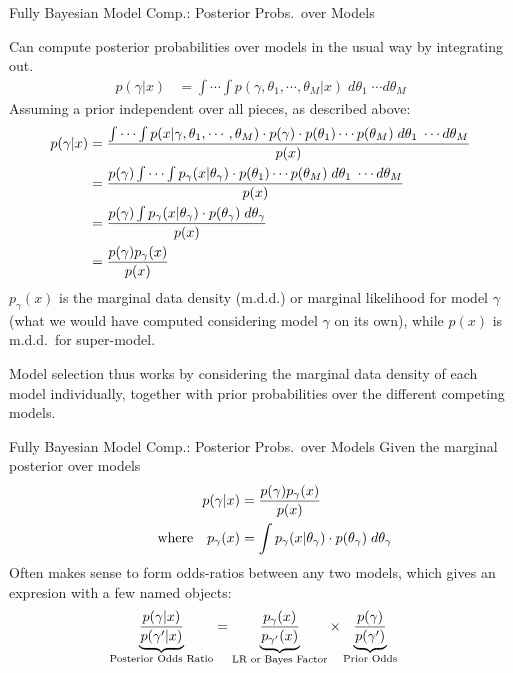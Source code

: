 \documentclass[aspectratio=169, handout]{beamer}
\begin{document}
{\scriptsize
\begin{frame}{Fully Bayesian Model Comp.: Posterior Probs.\ over Models}

Can compute posterior probabilities over models in the usual way by
integrating out.
\begin{align*}
  p(\gamma|x)
  &=
  \int
  \cdots
  \int
  p(\gamma,\theta_1,\cdots,\theta_M|x)
  \;d\theta_1\;\cdots d\theta_M
\end{align*}
Assuming a prior independent over all pieces, as described above:
\begin{align*}
  p(\gamma|x)
  &=
  \frac{%
    \int
    \cdots
    \int
    p(x|\gamma,\theta_1,\cdots,\theta_M)
    \cdot
    p(\gamma)
    \cdot
    p(\theta_1)
    \cdots
    p(\theta_M)
    \;d\theta_1\;\cdots d\theta_M
  }{%
    p(x)
  }
  \\
  &=
  \frac{%
    p(\gamma)
    \int
    \cdots
    \int
    p_\gamma(x|\theta_\gamma)
    \cdot
    p(\theta_1)
    \cdots
    p(\theta_M)
    \;d\theta_1\;\cdots d\theta_M
  }{%
    p(x)
  }
  \\
  &=
  \frac{%
    p(\gamma)
    \int
    p_\gamma(x|\theta_\gamma)
    \cdot
    p(\theta_\gamma)
    \;d\theta_\gamma
  }{%
    p(x)
  }
  \\
  &=
  \frac{%
    p(\gamma)
    p_\gamma(x)
  }{%
    p(x)
  }
\end{align*}
$p_\gamma(x)$ is the \alert{marginal data density} (m.d.d.) or
\alert{marginal likelihood} for model $\gamma$ (what we would have
computed considering model $\gamma$ on its own), while $p(x)$ is m.d.d.\
for super-model.

Model selection thus works by considering the marginal data density of
each model \alert{individually}, together with prior probabilities over
the different competing models.
\end{frame}
}


{\footnotesize
\begin{frame}{Fully Bayesian Model Comp.: Posterior Probs.\ over Models}
Given the marginal posterior over models
\begin{align*}
  p(\gamma|x)
  &=
  \frac{%
    p(\gamma)
    p_\gamma(x)
  }{%
    p(x)
  }
  \\
  \qquad\text{where}\quad
  p_\gamma(x)
  &=
  \int
  p_\gamma(x|\theta_\gamma)
  \cdot
  p(\theta_\gamma)
  \;d\theta_\gamma
\end{align*}
Often makes sense to form \alert{odds-ratios} between any two models,
which gives an expresion with a few named objects:
\begin{align*}
  \underbrace{%
    \frac{%
      p(\gamma|x)
    }{%
      p(\gamma'|x)
    }
  }_{\text{Posterior Odds Ratio}}
  &=
  \underbrace{%
  \frac{%
    p_\gamma(x)
  }{%
    p_{\gamma'}(x)
  }
  }_{\text{LR or Bayes Factor}}
  \times
  \underbrace{%
  \frac{%
    p(\gamma)
  }{%
    p(\gamma')
  }
  }_{\text{Prior Odds}}
\end{align*}
\end{frame}
}
\end{document}
